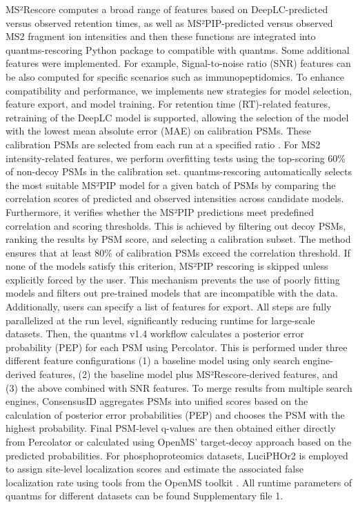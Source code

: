 \documentclass[12pt]{article}
\begin{document}
MS²Rescore computes a broad range of features based on DeepLC-predicted versus observed retention times, as well as MS²PIP-predicted versus observed MS2 fragment ion intensities and then these functions are integrated into quantms-rescoring Python package to compatible with quantms. Some additional features were implemented. For example, Signal-to-noise ratio (SNR) features can be also computed for specific scenarios such as immunopeptidomics.
To enhance compatibility and performance, we implements new strategies for model selection, feature export, and model training. For retention time (RT)-related features, retraining of the DeepLC model is supported, allowing the selection of the model with the lowest mean absolute error (MAE) on calibration PSMs. These calibration PSMs are selected from each run at a specified ratio \cite{bouwmeester_deeplc_2025}.
For MS2 intensity-related features, we perform overfitting tests using the top-scoring 60\% of non-decoy PSMs in the calibration set. quantms-rescoring automatically selects the most suitable MS²PIP model for a given batch of PSMs by comparing the correlation scores of predicted and observed intensities across candidate models. Furthermore, it verifies whether the MS²PIP predictions meet predefined correlation and scoring thresholds. This is achieved by filtering out decoy PSMs, ranking the results by PSM score, and selecting a calibration subset. The method ensures that at least 80\% of calibration PSMs exceed the correlation threshold. If none of the models satisfy this criterion, MS²PIP rescoring is skipped unless explicitly forced by the user. This mechanism prevents the use of poorly fitting models and filters out pre-trained models that are incompatible with the data. Additionally, users can specify a list of features for export. All steps are fully parallelized at the run level, significantly reducing runtime for large-scale datasets.
Then, the quantms v1.4 workflow calculates a posterior error probability (PEP) for each PSM using Percolator. This is performed under three different feature configurations (1) a baseline model using only search engine-derived features, (2) the baseline model plus MS²Rescore-derived features, and (3) the above combined with SNR features. To merge results from multiple search engines, ConsensusID aggregates PSMs into unified scores based on the calculation of posterior error probabilities (PEP) and chooses the PSM with the highest probability. Final PSM-level q-values are then obtained either directly from Percolator or calculated using OpenMS' target-decoy approach based on the predicted probabilities. For phosphoproteomics datasets, LuciPHOr2 is employed to assign site-level localization scores and estimate the associated false localization rate using tools from the OpenMS toolkit \cite{rost_openms_2016}. All runtime parameters of quantms for different datasets can be found Supplementary file 1.
\end{document}

